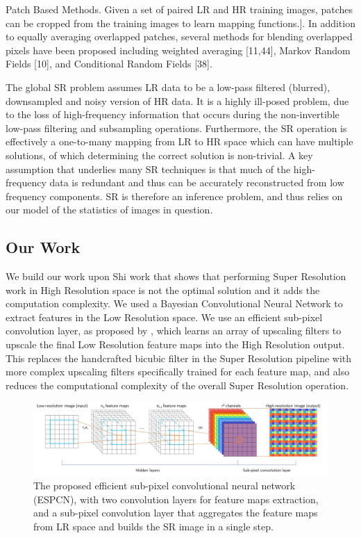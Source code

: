 Patch Based Methods. Given a set of paired LR and HR training images,
patches can be cropped from the training images to learn mapping functions.]. In addition to equally averaging overlapped patches, several methods for blending overlapped pixels have been proposed including weighted averaging [11,44], Markov Random Fields [10], and Conditional Random Fields [38].



The global \ac{SR} problem assumes \ac{LR} data to be a low-pass filtered (blurred), downsampled and noisy version of \ac{HR} data. It is a highly ill-posed problem, due to the loss of high-frequency information that occurs during the non-invertible low-pass filtering and subsampling operations. Furthermore, the SR operation is effectively a one-to-many mapping from \ac{LR} to \ac{HR} space which can have multiple solutions, of which determining the correct solution is non-trivial. A key assumption that underlies many \ac{SR} techniques is that much of the high-frequency data is redundant and thus can be accurately reconstructed from low frequency components. \ac{SR} is therefore an inference problem, and thus relies on our model of the statistics of images in question.


\subsection{Our Work}

We build our work upon Shi \citet{DBLP:journals/corr/ShiCHTABRW16} work that shows that performing Super Resolution work in High Resolution space is not the optimal solution and it adds the computation complexity. We used a Bayesian Convolutional Neural Network to extract features in the Low Resolution space. We use an efficient sub-pixel convolution layer, as proposed by \citet{DBLP:journals/corr/ShiCHTABRW16}, which learns an array of upscaling filters to upscale the final Low Resolution feature maps into the High Resolution output. This replaces the handcrafted bicubic filter in the Super Resolution pipeline with more complex upscaling filters specifically trained for each feature map, and also reduces the computational complexity of the overall Super Resolution operation.

\begin{figure}[htbp]
\begin{center}
\includegraphics[width=1.0\linewidth]{Chapter6/Figs/networkstructure.jpg}
\caption{The proposed efficient sub-pixel convolutional neural network (ESPCN), with two convolution layers for feature maps extraction, and a sub-pixel convolution layer that aggregates the feature maps from \ac{LR} space and builds the \ac{SR} image in a single step.}
\label{fig:networkstructure}
\end{center}
\end{figure}

